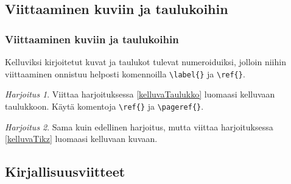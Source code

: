 \documentclass[handout]{beamer}
\theoremstyle{remark}
\newtheorem{harj}{Harjoitus}[section]
\newcommand{\vaihto}{\\ \vspace{10pt}}
\begin{document}
\subsection{Viittaaminen kuviin ja taulukoihin}
\begin{frame}[fragile]
\frametitle{Viittaaminen kuviin ja taulukoihin}
Kelluviksi kirjoitetut kuvat ja taulukot tulevat numeroiduiksi, jolloin niihin viittaaminen onnistuu helposti komennoilla \verb-\label{}- ja \verb-\ref{}-. 
\begin{harj}
Viittaa harjoituksessa \ref{kelluvaTaulukko} luomaasi kelluvaan taulukkoon. Käytä komentoja \verb-\ref{}- ja \verb-\pageref{}-.
\vaihto
\end{harj}
\begin{harj}
Sama kuin edellinen harjoitus, mutta viittaa harjoituksessa \ref{kelluvaTikz} luomaasi kelluvaan kuvaan.
\end{harj}
\end{frame}
\subsection{Kirjallisuusviitteet}
\end{document}
